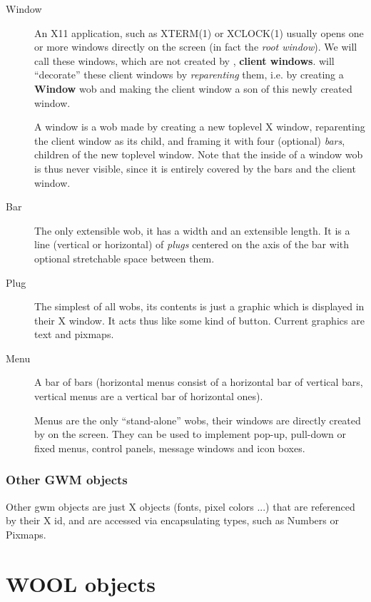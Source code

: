 \begin{description}

\item[Window] An X11 application, such as XTERM(1) or XCLOCK(1) usually opens
one or more windows directly on the screen (in fact the {\em root window}).
We will call these windows, which are not created by {\GWM}, {\bf client
windows}.  {\GWM} will ``decorate'' these client windows by {\em
reparenting} them, i.e. by creating a {\bf Window} wob and making the client
window a son of this newly created window.

A window is a wob made by creating a new toplevel X window, reparenting  the
client window as its child, and framing it with four (optional) {\em bars},
children of the new toplevel window. Note that the inside of a window wob is
thus never visible, since it is entirely covered by the bars and the client
window.

\item[Bar] The only extensible wob, it has a width and an extensible length.
It is a line (vertical or horizontal) of {\em plugs} centered on the axis of
the bar with optional stretchable space between them.

\item[Plug] The simplest of all wobs, its contents is just a graphic
which is displayed in their X window. It acts thus like some kind of button.
Current graphics are text and pixmaps.

\item[Menu] A bar of bars (horizontal menus consist of a
horizontal bar of vertical bars, vertical menus are a vertical bar of
horizontal ones).

Menus are the only ``stand-alone'' wobs, their windows are directly created
by {\GWM} on the screen. They can be used to implement pop-up, pull-down or
fixed menus, control panels, message windows and icon boxes.

\end{description}

\subsubsection{Other GWM objects}

Other gwm objects are just X objects (fonts, pixel colors ...) that are
referenced by their X id, and are accessed via encapsulating
{\WOOL} types, such as Numbers or Pixmaps.

\section{WOOL objects}

